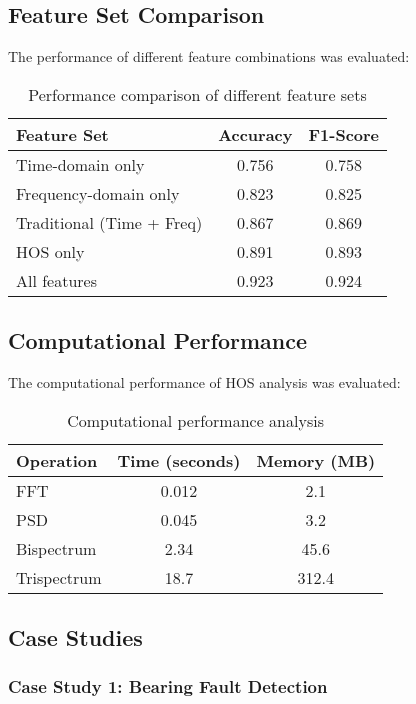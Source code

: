 \subsection{Feature Set Comparison}

The performance of different feature combinations was evaluated:

\begin{table}[H]
\centering
\caption{Performance comparison of different feature sets}
\label{tab:feature_set_comparison}
\begin{tabular}{@{}lcc@{}}
\toprule
Feature Set & Accuracy & F1-Score \\
\midrule
Time-domain only & 0.756 & 0.758 \\
Frequency-domain only & 0.823 & 0.825 \\
Traditional (Time + Freq) & 0.867 & 0.869 \\
HOS only & 0.891 & 0.893 \\
All features & 0.923 & 0.924 \\
\bottomrule
\end{tabular}
\end{table}

\subsection{Computational Performance}

The computational performance of HOS analysis was evaluated:

\begin{table}[H]
\centering
\caption{Computational performance analysis}
\label{tab:computational_performance}
\begin{tabular}{@{}lcc@{}}
\toprule
Operation & Time (seconds) & Memory (MB) \\
\midrule
FFT & 0.012 & 2.1 \\
PSD & 0.045 & 3.2 \\
Bispectrum & 2.34 & 45.6 \\
Trispectrum & 18.7 & 312.4 \\
\bottomrule
\end{tabular}
\end{table}

\subsection{Case Studies}

\subsubsection{Case Study 1: Bearing Fault Detection}


